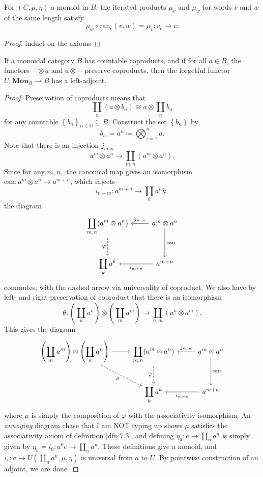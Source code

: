 \begin{proposition}\label{prp:7.1}
	For $(C,\mu,\eta)$ a monoid in $B$, the iterated products $\mu_v$ and $\mu_w$ for words $v$ and $w$ of the same length satisfy
	\[
		\mu_w\circ \mathrm{can} _c(v,w)=\mu_v : v_c \to c
	.\]
\end{proposition}
\begin{proof}
	induct on the axioms
\end{proof}

\begin{theorem}\label{thm:7.2}
	If a monoidal category $B$ has countable coproducts, and if for all $a\in B$, the functors $-\otimes a$ and $a\otimes -$ preserve coproducts, then the forgetful functor $U:\mathbf{Mon} _B \to B$ has a left-adjoint.
\end{theorem}
\begin{proof}
	Preservation of coproducts means that
	\[
		\coprod_n (a\otimes b_n)\cong a\otimes \coprod_n b_n
	\]
	for any countable $\left\{ b_n \right\}_{n\in\mathbb{N} } \subseteq B$. Construct the set $\left\{ b_n \right\} $ by
	\[
		b_n \coloneqq a^n \coloneqq \bigotimes_{i=1}^n a
	.\]
	Note that there is an injection $j_{m,n} $
	\[
		a^m \otimes a^n \to \coprod_{m,n} (a^m \otimes a^n)
	.\]
	Since for any $m, n,$ the canonical map gives an isomorphism $\mathrm{can} : a^m \otimes a^n \to a^{m+n} $, which injects
	\[
		i_{n+m} : a^{m+n}  \to \coprod_ka^nk
	,\]
	the diagram
	\[\begin{tikzcd}[row sep = 2.5em, column sep = 2.5em]
		\displaystyle{\coprod_{m,n} (a^m \otimes a^n)}\ar[" \varphi "', dashed, d]  & a^m \otimes a^n \ar[" j_{m,n}  "', l] \ar[" \mathrm{can}  ", d]  \\
		\displaystyle{\coprod_{k} a^k} & a^{m+n} \ar[" i_{m+n}  ", l] 
	\end{tikzcd}\]
	commutes, with the dashed arrow via universality of coproduct. We also have by left- and right-preservation of coproduct that there is an isomorphism
	\[
		\theta : \left( \coprod_n a^n \right) \otimes \left( \coprod_{m} a^m \right)  \to \coprod_{n,m} (a^n \otimes a^m)
	.\]
	This gives the diagram
	\[\begin{tikzcd}[row sep = 2.5em, column sep = 2.5em]
		\displaystyle{\left( \coprod_m a^m \right) \otimes \left( \coprod_n a^n \right) }\ar[r] \ar[" \mu "', dashed, dr] &\displaystyle{\coprod_{m,n} (a^m \otimes a^n)}\ar[" \varphi "', dashed, d]  & a^m \otimes a^n \ar[" j_{m,n}  "', l] \ar[" \mathrm{can}  ", d]  \\
																  &\displaystyle{\coprod_{k} a^k} & a^{m+n} \ar[" i_{m+n}  ", l] 
	\end{tikzcd}\]
	where $\mu$ is simply the composition of $\varphi$ with the associativity isomorphism. An \emph{annoying} diagram chase that I am NOT typing up shows $\mu$ satisfies the associativity axiom of definition \ref{dfn:7.3}, and defining $\eta_a : e \to \coprod_n a^n$ is simply given by $\eta_a = i_0 : a^0 e \to \coprod_na^n$. These definitions give a monoid, and $i_1 : a \to U(\coprod_n a^n,\mu,\eta)$ is universal from $a$ to $U$. By pointwise construction of an adjoint, we are done.
\end{proof}

